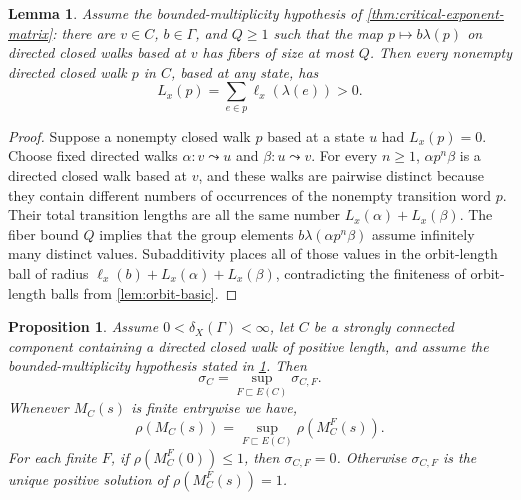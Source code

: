 \documentclass[11pt]{article}
\newtheorem{proposition}[proposition]{Proposition}
\newtheorem{lemma}[lemma]{Lemma}
\theoremstyle{definition}
\begin{document}
\begin{lemma}
\label{lem:positive-cycle-length}
Assume the bounded-multiplicity hypothesis of \cref{thm:critical-exponent-matrix}: there are
$v\in C$, $b\in\Gamma$, and $Q\ge1$ such that the map
$p\mapsto b\lambda(p)$ on directed closed walks based at $v$ has fibers of size at
most $Q$.  Then every nonempty directed closed walk $p$ in $C$, based at any state,
has
\[
 L_x(p)=\sum_{e\in p}\ell_x(\lambda(e))>0.
\]
\end{lemma}

\begin{proof}
Suppose a nonempty closed walk $p$ based at a state $u$ had $L_x(p)=0$.  Choose fixed
directed walks $\alpha:v\leadsto u$ and $\beta:u\leadsto v$.  For every $n\ge1$,
$\alpha p^n\beta$ is a directed closed walk based at $v$, and these walks are
pairwise distinct because they contain different numbers of occurrences of the nonempty
transition word $p$.  Their total transition lengths are all the same number
$L_x(\alpha)+L_x(\beta)$.  The fiber bound $Q$ implies that the group elements
$b\lambda(\alpha p^n\beta)$ assume infinitely many distinct values.  Subadditivity places all
of those values in the orbit-length ball of radius
$\ell_x(b)+L_x(\alpha)+L_x(\beta)$, contradicting the finiteness of orbit-length balls from
\cref{lem:orbit-basic}.
\end{proof}

\begin{proposition}
\label{prop:finite-transition-variation}
Assume $0<\delta_X(\Gamma)<\infty$, let $C$ be a strongly connected component containing a
directed closed walk of positive length, and assume the bounded-multiplicity hypothesis stated
in \cref{lem:positive-cycle-length}.  Then
\begin{equation}\label{eq:finite-transition-variation}
 \sigma_C=\sup_{F\sqsubset E(C)}\sigma_{C,F}.
\end{equation}
Whenever $M_C(s)$ is finite entrywise we have,
\begin{equation}\label{eq:spectral-monotone-exhaustion}
 \rho(M_C(s))=
 \sup_{F\sqsubset E(C)}\rho(M_C^F(s)).
\end{equation}
For each finite $F$, if $\rho(M_C^F(0))\le1$, then $\sigma_{C,F}=0$. Otherwise
$\sigma_{C,F}$ is the unique positive solution of $\rho(M_C^F(s))=1$.
\end{proposition}
\end{document}
